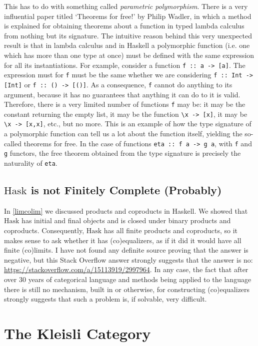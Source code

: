 \documentclass[11pt]{article}
\theoremstyle{nonumberplain}
\newcommand{\Hask}{\mathrm{Hask}}
\newcommand*\lsin{\lstinline}
\begin{document}
This has to do with something called \emph{parametric polymorphism}. There is a very influential paper titled `Theorems for free!' \cite{theoremsforfree} by Philip Wadler, in which a method is explained for obtaining theorems about a function in typed lambda calculus from nothing but its signature. The intuitive reason behind this very unexpected result is that in lambda calculus and in Haskell a polymorphic function (i.e. one which has more than one type at once) must be defined with the same expression for all its instantiations. For example, consider a function \lsin|f :: a -> [a]|. The expression must for \lsin|f| must be the same whether we are considering \lsin|f :: Int -> [Int]| or \lsin|f :: () -> [()]|. As a consequence, \lsin|f| cannot do anything to its argument, because it has no guarantees that anything it can do to it is valid. Therefore, there is a very limited number of functions \lsin|f| may be: it may be the constant returning the empty list, it may be the function \lsin|\x -> [x]|, it may be \lsin|\x -> [x,x]|, etc., but no more. This is an example of how the type signature of a polymorphic function can tell us a lot about the function itself, yielding the so-called theorems for free. In the case of functions \lsin|eta :: f a -> g a|, with \lsin|f| and \lsin|g| functors, the free theorem obtained from the type signature is precisely the naturality of \lsin|eta|. \cite{parametric}

\subsection{\texorpdfstring{$\Hask$}{Hask} is not Finitely Complete (Probably)}

In \ref{limcolim} we discussed products and coproducts in Haskell. We showed that $\Hask$ has initial and final objects and is closed under binary products and coproducts. Consequently, $\Hask$ has all finite products and coproducts, so it makes sense to ask whether it has (co)equalizers, as if it did it would have all finite (co)limits. I have not found any definite source proving that the answer is negative, but this Stack Overflow answer strongly suggests that the answer is no: \url{https://stackoverflow.com/a/15113919/2997964}. In any case, the fact that after over 30 years of categorical language and methods being applied to the language there is still no mechanism, built in or otherwise, for constructing (co)equalizers strongly suggests that such a problem is, if solvable, very difficult.

\section{The Kleisli Category}
\end{document}
